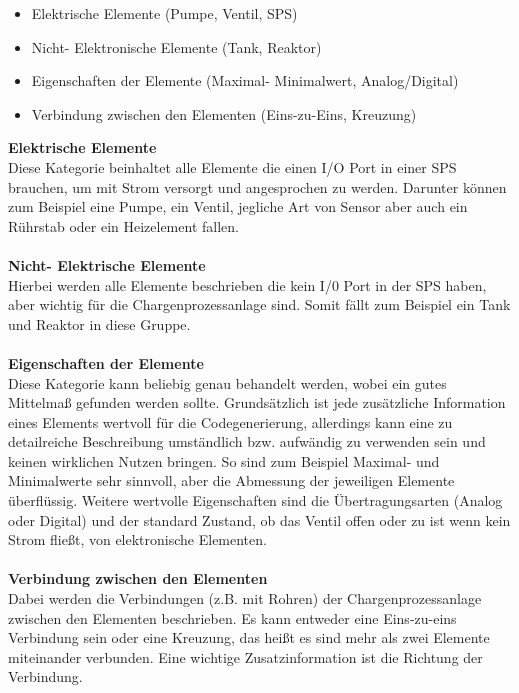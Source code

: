 \begin{itemize}
  \item Elektrische Elemente (Pumpe, Ventil, SPS)
  \item Nicht- Elektronische Elemente (Tank, Reaktor)
  \item Eigenschaften der Elemente (Maximal- Minimalwert, Analog/Digital)
  \item Verbindung zwischen den Elementen (Eins-zu-Eins, Kreuzung)
\end{itemize}

\textbf{Elektrische Elemente}\\
Diese Kategorie beinhaltet alle Elemente die einen I/O Port in einer SPS brauchen, um mit Strom versorgt und angesprochen zu werden. Darunter können zum Beispiel eine Pumpe, ein Ventil, jegliche Art von Sensor aber auch ein Rührstab oder ein Heizelement fallen. \\\\
\textbf{Nicht- Elektrische Elemente}\\
Hierbei werden alle Elemente beschrieben die kein I/0 Port in der SPS haben, aber wichtig für die Chargenprozessanlage sind. Somit fällt zum Beispiel ein Tank und Reaktor in diese Gruppe.\\\\
\textbf{Eigenschaften der Elemente}  \\
Diese Kategorie kann beliebig genau behandelt werden, wobei ein gutes Mittelmaß gefunden werden sollte. Grundsätzlich ist jede zusätzliche Information eines Elements wertvoll für die Codegenerierung, allerdings kann eine zu detailreiche Beschreibung umständlich bzw. aufwändig zu verwenden sein und keinen wirklichen Nutzen bringen.
So sind zum Beispiel Maximal- und Minimalwerte sehr sinnvoll, aber die Abmessung der jeweiligen Elemente überflüssig. Weitere wertvolle Eigenschaften sind die Übertragungsarten (Analog oder Digital) und der standard Zustand, ob das Ventil offen oder zu ist wenn kein Strom fließt, von elektronische Elementen.   \\\\
\textbf{Verbindung zwischen den Elementen}  \\
Dabei werden die Verbindungen (z.B. mit Rohren) der Chargenprozessanlage zwischen den Elementen beschrieben. 
Es kann entweder eine Eins-zu-eins Verbindung sein oder eine Kreuzung, das heißt es sind mehr als zwei Elemente miteinander verbunden. Eine wichtige Zusatzinformation ist die Richtung der Verbindung.

